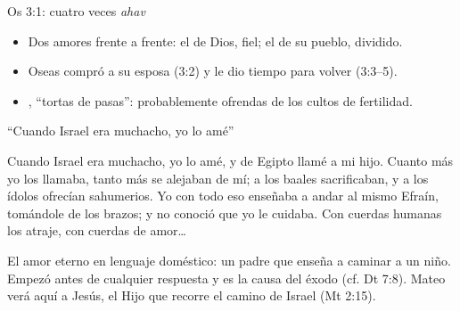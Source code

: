 \begin{frame}{Os 3:1: cuatro veces \emph{ahav}}
\centering
{}\par\bigskip
\small\begin{itemize}
\item Dos amores frente a frente: el de Dios, fiel; el de su pueblo, dividido.
\item Oseas compró a su esposa (3:2) y le dio tiempo para volver (3:3--5).
\item {}, ``tortas de pasas'': probablemente ofrendas de los cultos de fertilidad.
\end{itemize}
\end{frame}

\begin{frame}{``Cuando Israel era muchacho, yo lo amé''}
\begin{center}\end{center}
\begin{cita}Cuando Israel era muchacho, yo lo amé, y de Egipto llamé a mi hijo. Cuanto más yo los llamaba, tanto más se alejaban de mí; a los baales sacrificaban, y a los ídolos ofrecían sahumerios. Yo con todo eso enseñaba a andar al mismo Efraín, tomándole de los brazos; y no conoció que yo le cuidaba. Con cuerdas humanas los atraje, con cuerdas de amor\ldots{}\end{cita}
\small El amor eterno en lenguaje doméstico: un padre que enseña a caminar a un niño. Empezó antes de cualquier respuesta y es la causa del éxodo (cf. Dt 7:8). Mateo verá aquí a Jesús, el Hijo que recorre el camino de Israel (Mt 2:15).
\end{frame}

